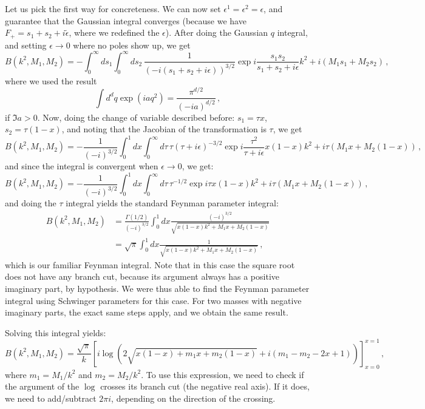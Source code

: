 \documentclass[twoside]{article}
\begin{document}
Let us pick the first way for concreteness.
We can now set $\epsilon^1=\epsilon^2=\epsilon$, and guarantee that the Gaussian integral converges (because we have $F_+ = s_1 + s_2 + i \tilde{\epsilon}$, where we redefined the $\epsilon$).
After doing the Gaussian $q$ integral, and setting $\epsilon \to 0$ where no poles show up, we get
\begin{equation}
B(k^2,M_1,M_2)= - \int_0^\infty ds_1 \int_0^\infty ds_2\,\frac{1}{(- i(s_1+s_2+ i \epsilon))^{3/2}} \exp{i\frac{s_1 s_2}{s_1+s_2+i\epsilon}k^2+ i (M_1 s_1 +M_2 s_2)}\,,
\end{equation}
where we used the result
\begin{equation}
\label{eq:gauss}
\int d^d q \exp(i a q^2) = \frac{\pi^{d/2}}{(-i a)^{d/2}}\,,
\end{equation}
if $\Im a > 0$.
Now, doing the change of variable described before: $s_1 = \tau x$, $s_2 = \tau (1-x)$, and noting that the Jacobian of the transformation is $\tau$, we get
\begin{equation}
B(k^2,M_1,M_2)= - \frac{1}{(- i)^{3/2}} \int_0^1 dx \int_0^\infty d\tau\, \tau (\tau+i \epsilon)^{-3/2}  \exp{i \frac{\tau^2}{\tau+i \epsilon} x (1-x)k^2+ i \tau (M_1 x +M_2 (1-x))}\,,
\end{equation}
and since the integral is convergent when $\epsilon \to 0$, we get:
\begin{equation}
B(k^2,M_1,M_2)= - \frac{1}{(- i)^{3/2}} \int_0^1 dx \int_0^\infty d\tau\, \tau^{-1/2}  \exp{i \tau x (1-x)k^2+ i \tau (M_1 x +M_2 (1-x))}\,,
\end{equation}
and doing the $\tau$ integral yields the standard Feynman parameter integral:
\begin{align}
B(k^2,M_1,M_2)&= \frac{\Gamma(1/2)}{(- i)^{3/2}} \int_0^1 dx \frac{(-i)^{3/2}}{\sqrt{x (1-x)k^2+ M_1 x +M_2 (1-x)}}\\
& = \sqrt{\pi}\int_0^1 dx \frac{1}{\sqrt{x (1-x)k^2+ M_1 x +M_2 (1-x)}} \,, \label{eq:Bsame}
\end{align}
which is our familiar Feynman integral.  
Note that in this case the square root does not have any branch cut, because its argument always has a positive imaginary part, by hypothesis. We were thus able to find the Feynman parameter integral using Schwinger parameters for this case. For two masses with negative imaginary parts, the exact same steps apply, and we obtain the same result.

Solving this integral yields:
\begin{equation}
\label{eq:Bfinalsame}
B(k^2,M_1,M_2) =\frac{\sqrt{\pi}}{k} \left[ i \log \left(2 \sqrt{x (1-x) + m_1 x + m_2 (1-x)}+i (m_1-m_2-2 x+1)\right)\right]_{x=0}^{x=1} \,,
\end{equation}
where $m_1 = M_1/k^2$ and $m_2 = M_2/k^2$. To use this expression, we need to check if the argument of the $\log$ crosses its branch cut (the negative real axis). If it does, we need to add/subtract $2 \pi i$, depending on the direction of the crossing.
\end{document}
